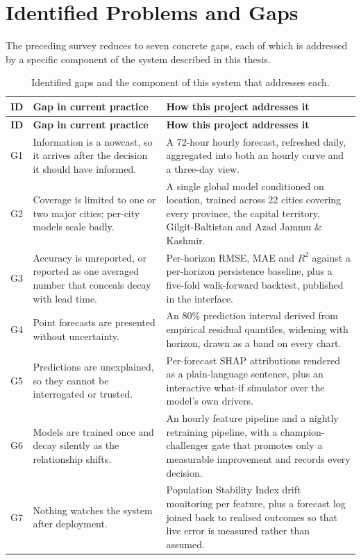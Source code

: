\section{Identified Problems and Gaps}
The preceding survey reduces to seven concrete gaps, each of which is addressed
by a specific component of the system described in this thesis.

\begin{xltabular}{\textwidth}{Q{1.3cm} P{4.6cm} Y}
\caption{Identified gaps and the component of this system that addresses each.}\label{tab:gaps}\\
\toprule
\bfseries ID & \bfseries Gap in current practice & \bfseries How this project addresses it \\
\midrule
\endfirsthead
\toprule
\bfseries ID & \bfseries Gap in current practice & \bfseries How this project addresses it \\
\midrule
\endhead
\bottomrule
\endlastfoot
G1 & Information is a nowcast, so it arrives after the decision it should have
informed. & A 72-hour hourly forecast, refreshed daily, aggregated into both an
hourly curve and a three-day view. \\
G2 & Coverage is limited to one or two major cities; per-city models scale
badly. & A single global model conditioned on location, trained across 22 cities
covering every province, the capital territory, Gilgit-Baltistan and Azad Jammu
\& Kashmir. \\
G3 & Accuracy is unreported, or reported as one averaged number that conceals
decay with lead time. & Per-horizon RMSE, MAE and $R^2$ against a per-horizon
persistence baseline, plus a five-fold walk-forward backtest, published in the
interface. \\
G4 & Point forecasts are presented without uncertainty. & An 80\% prediction
interval derived from empirical residual quantiles, widening with horizon, drawn
as a band on every chart. \\
G5 & Predictions are unexplained, so they cannot be interrogated or trusted. &
Per-forecast SHAP attributions rendered as a plain-language sentence, plus an
interactive what-if simulator over the model's own drivers. \\
G6 & Models are trained once and decay silently as the relationship shifts. &
An hourly feature pipeline and a nightly retraining pipeline, with a
champion-challenger gate that promotes only a measurable improvement and records
every decision. \\
G7 & Nothing watches the system after deployment. & Population Stability Index
drift monitoring per feature, plus a forecast log joined back to realised
outcomes so that live error is measured rather than assumed. \\
\end{xltabular}

